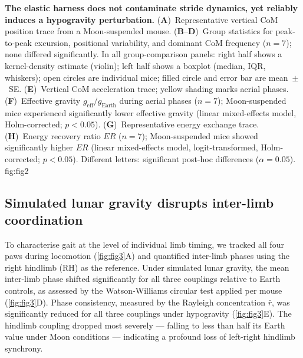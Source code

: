 \documentclass[blue]{enslyonstage}
\begin{document}
%
{%
\textbf{The elastic harness does not contaminate stride dynamics, yet reliably
induces a hypogravity perturbation.}
(\textbf{A})~Representative vertical CoM position trace from a Moon-suspended
mouse. (\textbf{B}--\textbf{D})~Group statistics for peak-to-peak excursion,
positional variability, and dominant CoM frequency ($n = 7$); none differed
significantly. In all group-comparison panels: right half shows a kernel-density
estimate (violin); left half shows a boxplot (median, IQR, whiskers); open
circles are individual mice; filled circle and error bar are mean~$\pm$~SE.
(\textbf{E})~Vertical CoM acceleration trace; yellow shading marks aerial
phases.
(\textbf{F})~Effective gravity $g_\text{eff}/g_\text{Earth}$ during aerial
phases ($n = 7$); Moon-suspended mice experienced significantly lower effective
gravity (linear mixed-effects model, Holm-corrected; $p < 0.05$).
(\textbf{G})~Representative energy exchange trace.
(\textbf{H})~Energy recovery ratio $ER$ ($n = 7$); Moon-suspended mice showed
significantly higher $ER$ (linear mixed-effects model, logit-transformed,
Holm-corrected; $p < 0.05$). Different letters: significant post-hoc
differences ($\alpha = 0.05$).%
}{fig:fig2}

\subsection{Simulated lunar gravity disrupts inter-limb coordination}

To characterise gait at the level of individual limb timing, we tracked all
four paws during locomotion (\autoref{fig:fig3}A) and quantified inter-limb
phases using the right hindlimb (RH) as the reference. Under simulated lunar
gravity, the mean inter-limb phase shifted significantly for all three couplings
relative to Earth controls, as assessed by the Watson-Williams circular test
applied per mouse (\autoref{fig:fig3}D). Phase consistency, measured by the
Rayleigh concentration $\bar r$, was significantly reduced for all three
couplings under hypogravity (\autoref{fig:fig3}E). The hindlimb coupling
dropped most severely --- falling to less than half its Earth value under Moon
conditions --- indicating a profound loss of left-right hindlimb synchrony.
\end{document}
